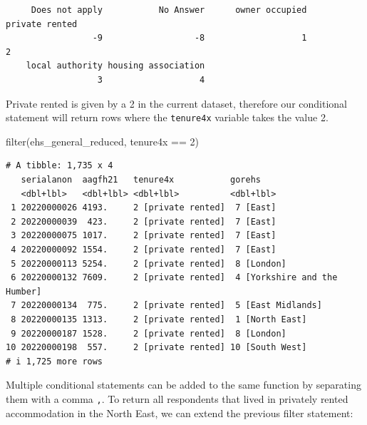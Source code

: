 \documentclass[
  letterpaper,
  DIV=11,
  numbers=noendperiod]{scrreprt}
\newenvironment{Shaded}{\begin{snugshade}}{\end{snugshade}}
\newcommand{\DecValTok}[1]{\textcolor[rgb]{0.68,0.00,0.00}{#1}}
\newcommand{\FunctionTok}[1]{\textcolor[rgb]{0.28,0.35,0.67}{#1}}
\newcommand{\NormalTok}[1]{\textcolor[rgb]{0.00,0.23,0.31}{#1}}
\newcommand{\SpecialCharTok}[1]{\textcolor[rgb]{0.37,0.37,0.37}{#1}}
\begin{document}
\begin{Shaded}
\end{Shaded}

\begin{verbatim}
     Does not apply           No Answer      owner occupied      private rented 
                 -9                  -8                   1                   2 
    local authority housing association 
                  3                   4 
\end{verbatim}

Private rented is given by a 2 in the current dataset, therefore our
conditional statement will return rows where the \texttt{tenure4x}
variable takes the value 2.

\begin{Shaded}
\begin{Highlighting}[]
\FunctionTok{filter}\NormalTok{(ehs\_general\_reduced, tenure4x }\SpecialCharTok{==} \DecValTok{2}\NormalTok{)}
\end{Highlighting}
\end{Shaded}

\begin{verbatim}
# A tibble: 1,735 x 4
   serialanon  aagfh21   tenure4x           gorehs                       
   <dbl+lbl>   <dbl+lbl> <dbl+lbl>          <dbl+lbl>                    
 1 20220000026 4193.     2 [private rented]  7 [East]                    
 2 20220000039  423.     2 [private rented]  7 [East]                    
 3 20220000075 1017.     2 [private rented]  7 [East]                    
 4 20220000092 1554.     2 [private rented]  7 [East]                    
 5 20220000113 5254.     2 [private rented]  8 [London]                  
 6 20220000132 7609.     2 [private rented]  4 [Yorkshire and the Humber]
 7 20220000134  775.     2 [private rented]  5 [East Midlands]           
 8 20220000135 1313.     2 [private rented]  1 [North East]              
 9 20220000187 1528.     2 [private rented]  8 [London]                  
10 20220000198  557.     2 [private rented] 10 [South West]              
# i 1,725 more rows
\end{verbatim}

Multiple conditional statements can be added to the same function by
separating them with a comma \texttt{,}. To return all respondents that
lived in privately rented accommodation in the North East, we can extend
the previous filter statement:
\end{document}
